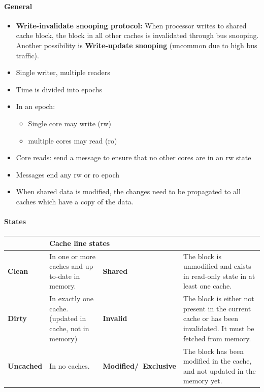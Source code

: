 			\paragraph{General}
			\begin{itemize}
			  	\item \textbf{Write-invalidate snooping protocol:} When processor writes to shared cache block, the block in all other caches is invalidated through bus snooping. Another possibility is \textbf{Write-update snooping} (uncommon due to high bus traffic). 
			  	\item Single writer, multiple readers
			  	\item Time is divided into epochs
			  	\item In an epoch:
			  		\begin{itemize}
			  	  		\item Single core may write (rw)
			  	  		\item multiple cores may read (ro)
			  	 	\end{itemize}
				\item Core reads: send a message to ensure that no other cores are in an rw state
				\item Messages end any rw or ro epoch
				\item When shared data is modified, the changes need to be propagated to all caches which have a copy of the data.
			\end{itemize}
			
			\paragraph{States}
			\begin{table}[H]\centering
				\begin{tabular}{|>{\bfseries}p{}|p{}|>{\bfseries}p{}|p{}|}
					\hline
					\multicolumn{2}{|l|}{\textbf{Memory block states}}
						& \multicolumn{2}{|l|}{\textbf{Cache line states}}\\
					\hline
					Clean
						& In one or more caches and up-to-date in memory.
						& Shared
						& The block is unmodified and exists in read-only state in at least one cache.\\
					\hline
					Dirty
						& In exactly one cache. (updated in cache, not in memory)
						& Invalid
						& The block is either not present in the current cache or has been invalidated. It must be fetched from memory.\\
					\hline
					Uncached
						& In no caches.
						& Modified/\newline\ Exclusive
						& The block has been modified in the cache, and not updated in the memory yet.\\
					\hline
				\end{tabular}
			\end{table}
			
